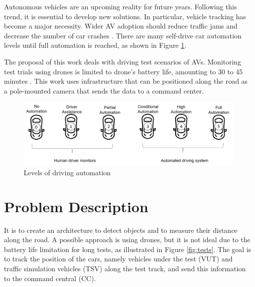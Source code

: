 Autonomous vehicles are an upcoming reality for future years. Following this trend, it is essential to develop new solutions. In particular, vehicle tracking has become a major necessity. Wider AV adoption should reduce traffic jams and decrease the number of car crashes \cite{bonnefon2016social}. There are many self-drive car automation levels until full automation is reached, as shown in Figure \ref{fig:automation}. 

The proposal of this work deals with driving test scenarios of AVs. Monitoring test trials using drones is limited to drone's battery life, amounting to 30 to 45 minutes \cite{9138314}. This work uses infrastructure that can be positioned along the road as a pole-mounted camera that sends the data to a command center.

\begin{figure}[H]
\centering
\includegraphics[scale=0.6]{imagens/Levels.png}
\caption{Levels of driving automation}
\label{fig:automation}
\end{figure}

\section{Problem Description}

It is to create an architecture to detect objects and to measure their distance along the road. A possible approach is using drones, but it is not ideal due to the battery life limitation for long tests, as illustrated in Figure \ref{fig:tests}. The goal is to track the position of the cars, namely vehicles under the test (VUT) and traffic simulation vehicles (TSV) along the test track, and send this information to the command central (CC). 

